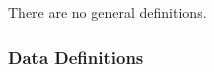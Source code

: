 \documentclass[12pt]{article}
\newcommand{\colAwidth}{0.13\textwidth}
\newcommand{\colBwidth}{0.82\textwidth}
\newcounter{defnum} %
\newcommand{\ddref}[1]{DD\ref{#1}}
\newcommand{\aref}[1]{A\ref{#1}}
\begin{document}

There are no general definitions.

%
%

\newpage

\subsubsection{Data Definitions}\label{sec_datadef}
\end{document}
